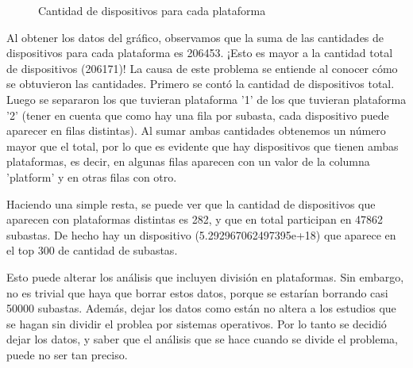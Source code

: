 \documentclass[a4paper, 12pt]{article}
\newcommand\tab[1][1cm]{\hspace*{#1}}
\begin{document}
	\FloatBarrier
		\begin{figure}
			\centering
		   	\caption{Cantidad de dispositivos para cada plataforma}
			\label{devicesporSO}
		\end{figure}
	\FloatBarrier
	
	\tab Al obtener los datos del gráfico, observamos que la suma de las cantidades de dispositivos para cada plataforma es 206453. ¡Esto es mayor a la cantidad total de dispositivos (206171)!\newline
	\tab La causa de este problema se entiende al conocer cómo se obtuvieron las cantidades. Primero se contó la cantidad de dispositivos total. Luego se separaron los que tuvieran plataforma '1' de los que tuvieran plataforma '2' (tener en cuenta que como hay una fila por subasta, cada dispositivo puede aparecer en filas distintas). Al sumar ambas cantidades obtenemos un número mayor que el total, por lo que es evidente que hay dispositivos que tienen ambas plataformas, es decir, en algunas filas aparecen con un valor de la columna 'platform' y en otras filas con otro.
	
	\tab Haciendo una simple resta, se puede ver que la cantidad de dispositivos que aparecen con plataformas distintas es 282, y que en total participan en 47862 subastas. De hecho hay un dispositivo (5.292967062497395e+18) que aparece en el top 300 de cantidad de subastas.
	
	\tab Esto puede alterar los análisis que incluyen división en plataformas. Sin embargo, no es trivial que haya que borrar estos datos, porque se estarían borrando casi 50000 subastas. Además, dejar los datos como están no altera a los estudios que se hagan sin dividir el problea por sistemas operativos. Por lo tanto se decidió dejar los datos, y saber que el análisis que se hace cuando se divide el problema, puede no ser tan preciso.
	
\end{document}
